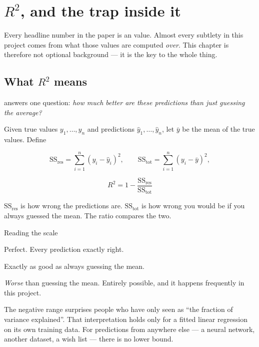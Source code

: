 \chapter{\texorpdfstring{$R^2$}{R-squared}, and the trap inside it}
\label{ch:metrics}

Every headline number in the paper is an \Rsq{} value. Almost every subtlety in
this project comes from what those values are computed \emph{over}. This
chapter is therefore not optional background --- it is the key to the whole
thing.

\section{What \texorpdfstring{$R^2$}{R-squared} means}

\Rsq{} answers one question: \emph{how much better are these predictions than
just guessing the average?}

Given true values $y_1,\dots,y_n$ and predictions $\hat{y}_1,\dots,\hat{y}_n$,
let $\bar{y}$ be the mean of the true values. Define

\[
  \mathrm{SS}_{\text{res}} = \sum_{i=1}^{n} (y_i - \hat{y}_i)^2,
  \qquad
  \mathrm{SS}_{\text{tot}} = \sum_{i=1}^{n} (y_i - \bar{y})^2,
\]

\[
  \boxed{\;R^2 = 1 - \frac{\mathrm{SS}_{\text{res}}}{\mathrm{SS}_{\text{tot}}}\;}
\]

$\mathrm{SS}_{\text{res}}$ is how wrong the predictions are.
$\mathrm{SS}_{\text{tot}}$ is how wrong you would be if you always guessed the
mean. The ratio compares the two.

\begin{keybox}{Reading the scale}
\begin{description}[leftmargin=1.6cm,style=nextline,itemsep=1pt]
\item[$R^2 = 1$] Perfect. Every prediction exactly right.
\item[$R^2 = 0$] Exactly as good as always guessing the mean.
\item[$R^2 < 0$] \emph{Worse} than guessing the mean. Entirely possible, and it
  happens frequently in this project.
\end{description}
The negative range surprises people who have only seen \Rsq{} as ``the fraction
of variance explained''. That interpretation holds only for a fitted linear
regression on its own training data. For predictions from anywhere else --- a
neural network, another dataset, a wish list --- there is no lower bound.
\end{keybox}

